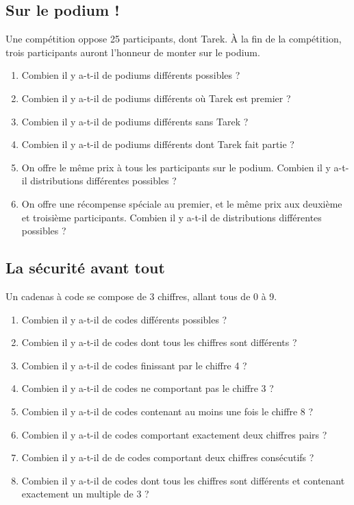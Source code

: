 \documentclass[oneside,12pt]{book}          %
\begin{document}
\subsection{Sur le podium !}
Une compétition oppose 25 participants, dont Tarek. À la fin de la compétition, trois participants auront l'honneur de monter sur le podium.
\begin{enumerate}
    \item Combien il y a-t-il de podiums différents possibles ?
    \item Combien il y a-t-il de podiums différents où Tarek est premier ?
    \item Combien il y a-t-il de podiums différents sans Tarek ?
    \item Combien il y a-t-il de podiums différents dont Tarek fait partie ?
    \item On offre le même prix à tous les participants sur le podium. Combien il y a-t-il distributions différentes possibles ?
    \item On offre une récompense spéciale au premier, et le même prix aux deuxième et troisième participants. Combien il y a-t-il de distributions différentes possibles ?
\end{enumerate}



\subsection{La sécurité avant tout}
Un cadenas à code se compose de 3 chiffres, allant tous de 0 à 9.
\begin{enumerate}
    \item Combien il y a-t-il de codes différents possibles ?
    \item Combien il y a-t-il de codes dont tous les chiffres sont différents ?
    \item Combien il y a-t-il de codes finissant par le chiffre 4 ?
    \item Combien il y a-t-il de codes ne comportant pas le chiffre 3 ?
    \item Combien il y a-t-il de codes contenant au moins une fois le chiffre 8 ?
    \item Combien il y a-t-il de codes comportant exactement deux chiffres pairs ?
    \item Combien il y a-t-il de de codes comportant deux chiffres consécutifs ?
    \item Combien il y a-t-il de codes dont tous les chiffres sont différents et contenant exactement un multiple de 3 ?
\end{enumerate}
\end{document}
